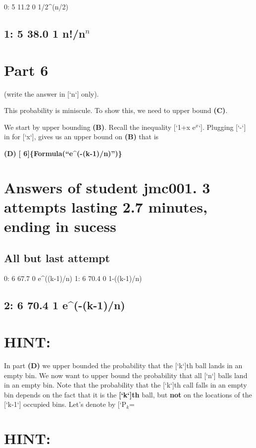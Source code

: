 \documentclass[11pt]{article}
\begin{document}
  0:      5     11.2    0       1/2^(n/2)
\subsection{1:   5     38.0    1       n!/n$^n$}
\label{sec-10-2}
\section{Part   6}
\label{sec-11}

 (write the answer in [`n`] only).

This probability is miniscule. To show this, we need to upper bound \textbf{(C)}.

We start by upper bounding \textbf{(B)}.  Recall the inequality [`1+x \leq e$^x$`]. Plugging [`-`] in for [`x`], gives us an upper bound on \textbf{(B)}
that is 

\textbf{(D)} \textbf{[  6]\{Formula(``e^(-(k-1)/n)'')\}}
\section{Answers of student jmc001.  3 attempts lasting 2.7 minutes, ending in sucess}
\label{sec-12}
\subsection{All but last attempt}
\label{sec-12-1}

  0:      6     67.7    0       e^((k-1)/n)
  1:      6     70.4    0       1-((k-1)/n)
\subsection{2:   6     70.4    1       e^(-(k-1)/n)}
\label{sec-12-2}
\section{HINT:}
\label{sec-13}

In part \textbf{(D)} we upper bounded the probability  that the [`k`]th ball
lands in an empty bin. We now want to upper bound the probability
that all [`n`] balls land in an empty bin. Note that the probability
that the [`k`]th call falls in an empty bin depends on the fact that
it is the \textbf{[`k`]th} ball, but \textbf{not} on the locations of the [`k-1`]
occupied bins. Let's denote by [`P$_k$= 
\section{HINT:}
\label{sec-14}
\end{document}
